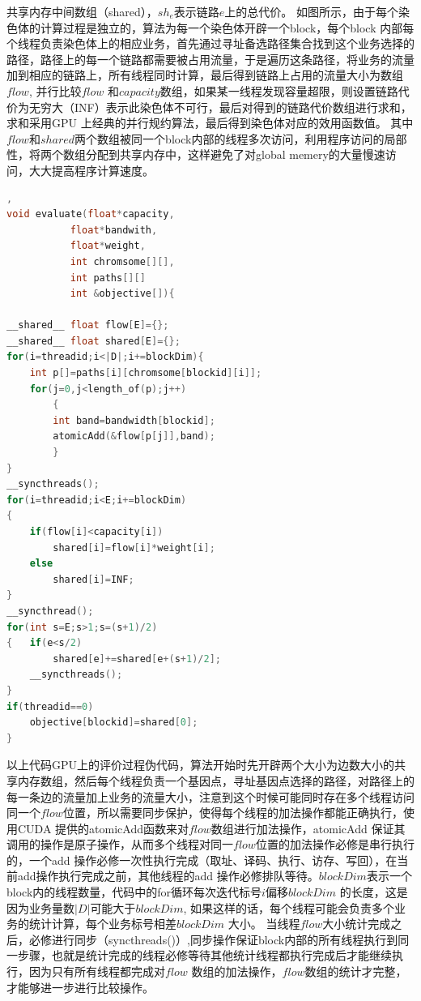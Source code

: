 共享内存中间数组（shared），$sh_e$表示链路$e$上的总代价。\newline
  如图所示，由于每个染色体的计算过程是独立的，算法为每一个染色体开辟一个block，每个block 内部每个线程负责染色体上的相应业务，首先通过寻址备选路径集合找到这个业务选择的路径，路径上的每一个链路都需要被占用流量，于是遍历这条路径，将业务的流量加到相应的链路上，所有线程同时计算，最后得到链路上占用的流量大小为数组$flow$, 并行比较$flow$ 和$capacity$数组，如果某一线程发现容量超限，则设置链路代价为无穷大（INF）表示此染色体不可行，最后对得到的链路代价数组进行求和，求和采用GPU 上经典的并行规约算法，最后得到染色体对应的效用函数值。
  其中$flow$和$shared$两个数组被同一个block内部的线程多次访问，利用程序访问的局部性，将两个数组分配到共享内存中，这样避免了对global memery的大量慢速访问，大大提高程序计算速度。
\begin{lstlisting}[language=C],
void evaluate(float*capacity,
		   float*bandwith,
		   float*weight,
		   int chromsome[][],
		   int paths[][]
		   int &objective[]){

__shared__ float flow[E]={};
__shared__ float shared[E]={};
for(i=threadid;i<|D|;i+=blockDim){
	int p[]=paths[i][chromsome[blockid][i]];
	for(j=0,j<length_of(p);j++)
		{
		int band=bandwidth[blockid];
		atomicAdd(&flow[p[j]],band);
		}		
}
__syncthreads();
for(i=threadid;i<E;i+=blockDim)
{
	if(flow[i]<capacity[i])
		shared[i]=flow[i]*weight[i];	
	else
		shared[i]=INF;	
}
__syncthread();
for(int s=E;s>1;s=(s+1)/2)
{	if(e<s/2)
		shared[e]+=shared[e+(s+1)/2];
	__syncthreads();
}
if(threadid==0)
	objective[blockid]=shared[0];
}
\end{lstlisting}
  以上代码GPU上的评价过程伪代码，算法开始时先开辟两个大小为边数大小的共享内存数组，然后每个线程负责一个基因点，寻址基因点选择的路径，对路径上的每一条边的流量加上业务的流量大小，注意到这个时候可能同时存在多个线程访问同一个$flow$位置，所以需要同步保护，使得每个线程的加法操作都能正确执行，使用CUDA 提供的atomicAdd函数来对$flow$数组进行加法操作，atomicAdd 保证其调用的操作是原子操作，从而多个线程对同一$flow$位置的加法操作必修是串行执行的，一个add 操作必修一次性执行完成（取址、译码、执行、访存、写回），在当前add操作执行完成之前，其他线程的add 操作必修排队等待。$blockDim$表示一个block内的线程数量，代码中的for循环每次迭代标号$i$偏移$blockDim$ 的长度，这是因为业务量数$|D|$可能大于$blockDim$, 如果这样的话，每个线程可能会负责多个业务的统计计算，每个业务标号相差$blockDim$ 大小。
  当线程$flow$大小统计完成之后，必修进行同步（syncthreads()）,同步操作保证block内部的所有线程执行到同一步骤，也就是统计完成的线程必修等待其他统计线程都执行完成后才能继续执行，因为只有所有线程都完成对$flow$ 数组的加法操作，$flow$数组的统计才完整，才能够进一步进行比较操作。
